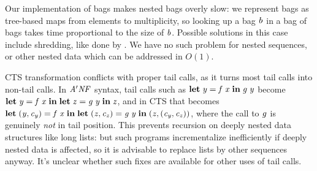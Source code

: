 






Our implementation of bags makes nested bags overly slow: we represent bags as
tree-based maps from elements to multiplicity, so looking up a bag \ensuremath{\Varid{b}} in a bag
of bags takes time proportional to the size of \ensuremath{\Varid{b}}. Possible solutions in this
case include shredding, like done by \citep{Koch2016incremental}. We have no
such problem for nested sequences, or other nested data which can be addressed
in $O(1)$.
%


\label{sec:tail-calls}
CTS transformation conflicts with proper tail calls, as it turns most tail calls
into non-tail calls.
In \ensuremath{\Conid{A'NF}} syntax, tail calls such as \ensuremath{\mathbf{let}\;\Varid{y}\mathrel{=}\Varid{f}\;\Varid{x}\;\mathbf{in}\;\Varid{g}\;\Varid{y}} become \ensuremath{\mathbf{let}\;\Varid{y}\mathrel{=}\Varid{f}\;\Varid{x}\;\mathbf{in}\;\mathbf{let}\;\Varid{z}\mathrel{=}\Varid{g}\;\Varid{y}\;\mathbf{in}\;\Varid{z}}, and in CTS that becomes \ensuremath{\mathbf{let}\;(\Varid{y},\Varid{c}_{\Varid{y}})\mathrel{=}\Varid{f}\;\Varid{x}\;\mathbf{in}\;\mathbf{let}\;(\Varid{z},\Varid{c}_{\Varid{z}})\mathrel{=}\Varid{g}\;\Varid{y}\;\mathbf{in}\;(\Varid{z},(\Varid{c}_{\Varid{y}},\Varid{c}_{\Varid{z}}))}, where the call to \ensuremath{\Varid{g}} is genuinely \emph{not} in tail
position.
This prevents recursion on deeply nested data structures like long lists: but such
programs incrementalize inefficiently if deeply nested data is affected, so
it is advisable to replace lists by other sequences anyway. It's unclear whether
such fixes are available for other uses of tail calls.

